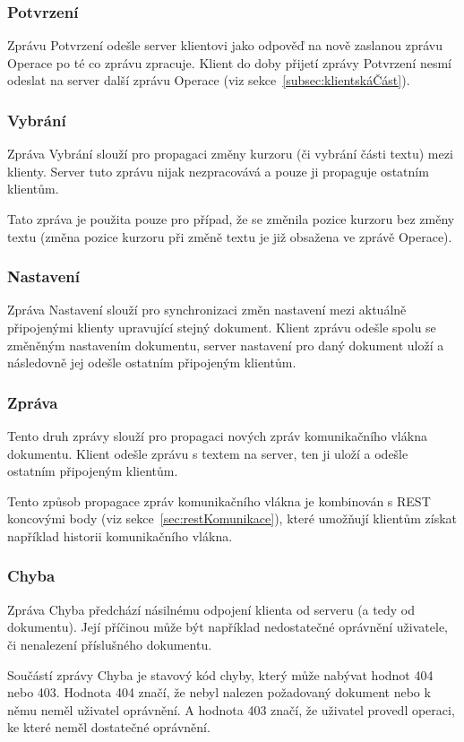 \subsubsection{Potvrzení} %

Zprávu Potvrzení odešle server klientovi jako odpověď na nově zaslanou zprávu Operace po té co zprávu zpracuje.
Klient do doby přijetí zprávy Potvrzení nesmí odeslat na server další zprávu Operace (viz sekce~\ref{subsec:klientskáČást}).

\subsubsection{Vybrání} %

Zpráva Vybrání slouží pro propagaci změny kurzoru (či vybrání části textu) mezi klienty.
Server tuto zprávu nijak nezpracovává a pouze ji propaguje ostatním klientům.

Tato zpráva je použita pouze pro případ, že se změnila pozice kurzoru bez změny textu (změna pozice kurzoru při změně textu je již obsažena ve zprávě Operace).

\subsubsection{Nastavení} %

Zpráva Nastavení slouží pro synchronizaci změn nastavení mezi aktuálně připojenými klienty upravující stejný dokument.
Klient zprávu odešle spolu se změněným nastavením dokumentu, server nastavení pro daný dokument uloží a následovně jej odešle ostatním připojeným klientům.

\subsubsection{Zpráva} %

Tento druh zprávy slouží pro propagaci nových zpráv komunikačního vlákna dokumentu.
Klient odešle zprávu s textem na server, ten ji uloží a odešle ostatním připojeným klientům.

Tento způsob propagace zpráv komunikačního vlákna je kombinován s \gls{REST} koncovými body (viz sekce~\ref{sec:restKomunikace}), které umožňují klientům získat například historii komunikačního vlákna.

\subsubsection{Chyba} %

Zpráva Chyba předchází násilnému odpojení klienta od serveru (a tedy od dokumentu).
Její příčinou může být například nedostatečné oprávnění uživatele, či nenalezení příslušného dokumentu.

Součástí zprávy Chyba je stavový kód chyby, který může nabývat hodnot 404 nebo 403.
Hodnota 404 značí, že nebyl nalezen požadovaný dokument nebo k němu neměl uživatel oprávnění.
A hodnota 403 značí, že uživatel provedl operaci, ke které neměl dostatečné oprávnění.